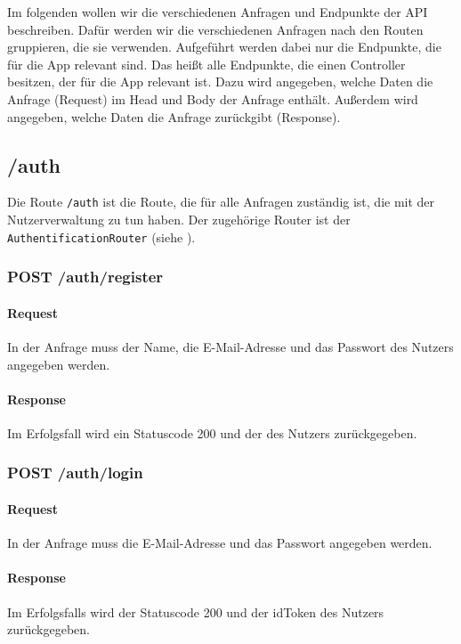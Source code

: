 \documentclass{entwurfsheft}
\begin{document}
Im folgenden wollen wir die verschiedenen Anfragen und Endpunkte der API beschreiben.
Dafür werden wir die verschiedenen Anfragen nach den Routen gruppieren, die sie verwenden.
Aufgeführt werden dabei nur die Endpunkte, die für die App relevant sind. 
Das heißt alle Endpunkte, die einen Controller besitzen, der für die App relevant ist.
Dazu wird angegeben, welche Daten die Anfrage (Request) im Head und Body der Anfrage enthält.
Außerdem wird angegeben, welche Daten die Anfrage zurückgibt (Response).

\subsection{/auth}
Die Route \texttt{/auth} ist die Route, die für alle Anfragen zuständig ist, die mit der Nutzerverwaltung zu tun haben.
Der zugehörige Router ist der \texttt{AuthentificationRouter} (siehe ).

\subsubsection*{POST /auth/register}
\paragraph{Request}
In der Anfrage muss der Name, die E-Mail-Adresse und das Passwort des Nutzers angegeben werden.

\paragraph{Response}
Im Erfolgsfall wird ein Statuscode 200 und der  des Nutzers zurückgegeben.

\subsubsection*{POST /auth/login}
    \paragraph{Request}
        In der Anfrage muss die E-Mail-Adresse und das Passwort angegeben werden.
    \paragraph{Response}
        Im Erfolgsfalls wird der Statuscode 200 und der idToken des Nutzers zurückgegeben.
\end{document}
